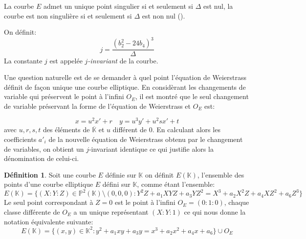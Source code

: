 \documentclass[10pt,a4paper]{book}
\theoremstyle{plain}
\theoremstyle{definition}
\theoremstyle{definition}
\theoremstyle{definition}
\theoremstyle{definition}
\newtheorem{defi}[thm]{Définition}
\theoremstyle{remark}
\theoremstyle{remark}
\theoremstyle{definition}
\begin{document}
La courbe $E$ admet un unique point singulier si et seulement si $\Delta$ est nul, la courbe est non singulière si et seulement si $\Delta$ est non nul (\cite[Prop. III.1.4]{Silv1}).



On définit: 
\begin{equation*}
j=\frac{(b_2^2-24b_4)^3}{\Delta}
\end{equation*}
La constante $j$ est appelée \emph{$j$-invariant} de la courbe.

Une question naturelle est de se demander à quel point l'équation de Weierstrass définit de façon unique une courbe elliptique. En considèrant les changements de variable qui préservent le point à l'infini $O_E$, il est montré \cite[III.3.1b]{Silv1} que le seul changement de variable préservant la forme de l'équation de Weierstrass et $O_E$ est:

\begin{equation*}
x=u^2x'+r    \quad  y=u^3y'+u^2sx'+t
\end{equation*}
avec $u,r,s,t$ des éléments de $\overline{\mathbb{K}}$ et $u$ différent de $0$. En calculant alors les coefficients $a'_i$ de la nouvelle équation de Weierstrass obtenu par le changement de variables, on obtient un $j$-invariant identique ce qui justifie alors la dénomination de celui-ci.
\newline


\begin{defi}
Soit une courbe $E$ définie sur $\mathbb{K}$ on définit $E(\mathbb{K})$, l'ensemble des points d'une courbe elliptique $E$ défini sur $\mathbb{K}$, comme étant l'ensemble:
\begin{equation*}
E(\mathbb{K})=\{(X:Y:Z)\in \mathbb{P}^2(\mathbb{K}) \setminus (0,0,0) : Y^2Z+a_1XYZ+a_3YZ^2=X^3+a_2X^2Z+a_4XZ^2+a_6Z^3 \}
\end{equation*}
Le seul point correspondant à $Z=0$ est le point à l'infini $O_E=(0:1:0)$, chaque classe différente de $O_E$ a un unique représentant $(X:Y:1)$ ce qui nous donne la notation équivalente suivante:
\begin{equation*}
E(\mathbb{K})=\{(x,y)\in \mathbb{K}^2  : y^2+a_1xy+a_3y=x^3+a_2x^2+a_4x+a_6 \} \cup {O_E}
\end{equation*}
\end{defi}
\end{document}
